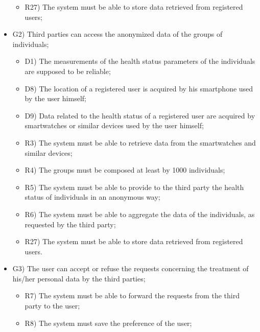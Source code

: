 \documentclass{article}
\begin{document}
\begin{legal}
\begin{legal}
\begin{legal}
\begin{itemize}
{\begin{itemize}
					\item R27) The system must be able to store data retrieved from registered users;\\
					\end{itemize}
				}
				\item G2) Third parties can access the anonymized data of the groups of individuals;\\
				{\normalfont
					\begin{itemize}
					\item D1) The measurements of the health status parameters of the individuals are supposed to be reliable;\\
	 				\item D8) The location of a registered user is acquired by his smartphone used by the user himself;\\
					\item D9) Data related to the health status of a registered user are acquired by smartwatches or similar devices used by the user himself;\\
					\item R3) The system must be able to retrieve data from the smartwatches and similar devices;\\
					\item R4) The groups must be composed at least by 1000 individuals;\\
					\item R5) The system must be able to provide to the third party the health status of individuals in an anonymous way;\\
					\item R6) The system must be able to aggregate the data of the individuals, as requested by the third party;\\
					\item R27) The system must be able to store data retrieved from registered users.\\
					\end{itemize}
				}
				\newpage
				\item G3) The user can accept or refuse the requests concerning the treatment of his/her personal data by the third parties;\\
				{\normalfont
					\begin{itemize}
					\item R7) The system must be able to forward the requests from the third party to the user;\\
	 				\item R8) The system must save the preference of the user;\\

\end{itemize}}
\end{itemize}
\end{legal}
\end{legal}
\end{legal}
\end{document}
